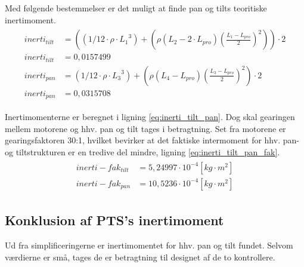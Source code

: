Med følgende bestemmelser er det muligt at finde pan og tilts teoritiske inertimoment.
\begin{align}
\label{eq:inerti_tilt_pan}
\begin{split}
{ inerti }_{ tilt } &= \left( \left( 1/12\cdot \rho \cdot { {L_{1}} }^{ 3 } \right) +\left( \rho \left( {L_{2}}-2\cdot {L_{pro}} \right) { \left( \frac { {L_{1}}-{L_{pro}}}{ 2 }  \right)  }^{ 2 } \right)  \right) \cdot 2
\\
{ inerti }_{ tilt } &= 0,0157499
\\
{ inerti }_{ pan }&=\left( 1/12\cdot \rho \cdot { { L }_{ 3 } }^{ 3 } \right) +\left( \rho \left( { L }_{ 4 }-{ L }_{ pro } \right) { \left( \frac { { L }_{ 3 }-{ L }_{ pro } }{ 2 }  \right)  }^{ 2 } \right) \cdot 2
\\
{ inerti }_{ pan } &=0,0315708
\end{split}
\end{align}

Inertimomenterne er beregnet i ligning \ref{eq:inerti_tilt_pan}. Dog skal gearingen mellem motorene og hhv. pan og tilt tages i betragtning. Set fra motorene er gearingsfaktoren 30:1, hvilket bevirker at det faktiske intermoment for hhv. pan- og tiltstrukturen er en tredive del mindre, ligning \ref{eq:inerti_tilt_pan_fak}.
\begin{align}
\label{eq:inerti_tilt_pan_fak}
\begin{split}
{inerti-fak}_{tilt}&=5,24997\cdot{10}^{-4} [kg \cdot {m}^{2}]
\\
{inerti-fak}_{pan}&=10,5236\cdot{10}^{-4} [kg \cdot {m}^{2}]
\end{split}
\end{align}

\subsection{Konklusion af PTS's inertimoment}
Ud fra simplificeringerne er inertimomentet for hhv. pan og tilt fundet. Selvom værdierne er små, tages de er betragtning til designet af de to kontrollere.



